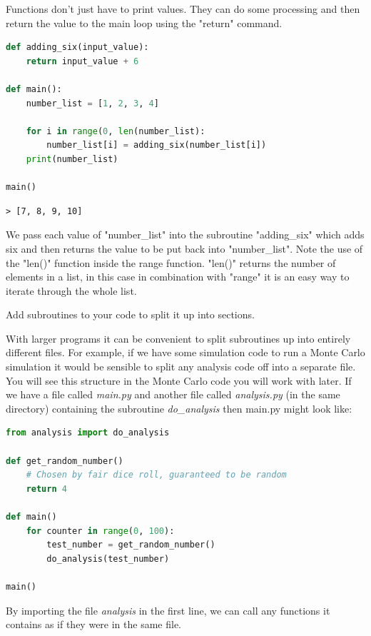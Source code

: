 				Functions don't just have to print values. They can do some processing and then return the value to the main loop using the "return" command.

			\begin{lstlisting}[language=Python]
def adding_six(input_value):
	return input_value + 6

def main():
	number_list = [1, 2, 3, 4]
	
	for i in range(0, len(number_list):
		number_list[i] = adding_six(number_list[i])
	print(number_list)
			
main()\end{lstlisting}

			\begin{verbatim}> [7, 8, 9, 10]\end{verbatim}
			
			We pass each value of "number\_list" into the subroutine "adding\_six" which adds six and then returns the value to be put back into "number\_list". Note the use of the "len()" function inside the range function. "len()" returns the number of elements in a list, in this case in combination with "range" it is an easy way to iterate through the whole list.
				
			\begin{task}Add subroutines to your code to split it up into sections.\end{task}

			With larger programs it can be convenient to split subroutines up into entirely different files. For example, if we have some simulation code to run a Monte Carlo simulation it would be sensible to split any analysis code off into a separate file. You will see this structure in the Monte Carlo code you will work with later. If we have a file called \textit{main.py} and another file called \textit{analysis.py} (in the same directory) containing the subroutine \textit{do\_analysis} then main.py might look like:
\begin{lstlisting}[language=Python]
from analysis import do_analysis

def get_random_number()
	# Chosen by fair dice roll, guaranteed to be random
	return 4
	
def main()
	for counter in range(0, 100):
		test_number = get_random_number()
		do_analysis(test_number)
			
main()\end{lstlisting}
By importing the file \textit{analysis} in the first line, we can call any functions it contains as if they were in the same file.

